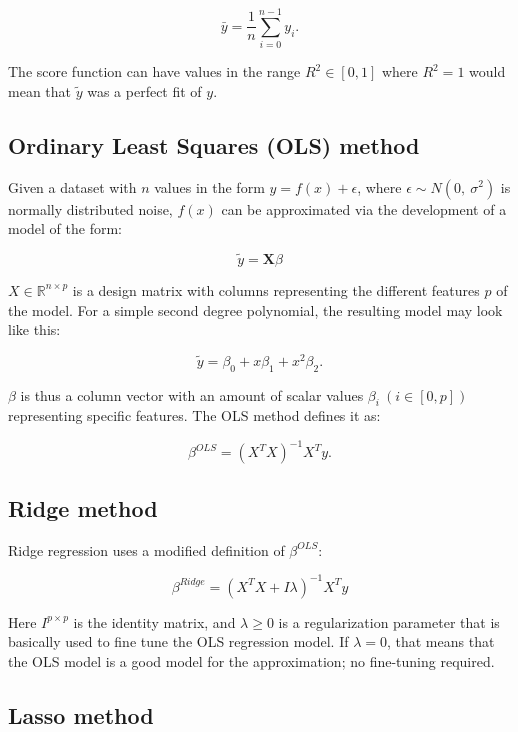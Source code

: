 \documentclass[reprint,english,notitlepage]{revtex4-1}  %
\begin{document}
\[
\bar{y} =  \frac{1}{n} \sum_{i=0}^{n - 1} y_i.
\]

The score function can have values in the range $R^2 \in [0, 1]$ where $R^2 = 1$ would mean that $\tilde{y}$ was a perfect fit of $y$.

\subsection{Ordinary Least Squares (OLS) method}

Given a dataset with $n$ values in the form $y = f(x) + \epsilon$, where $\epsilon \sim N(0, \ \sigma^2)$ is normally distributed noise, $f(x)$ can be approximated via the development of a model of the form:

\begin{equation} \label{eq:predict}
    \tilde{y} = \bm{X}\beta
\end{equation}


$X \in \mathbb{R}^{n \times p}$ is a design matrix with columns representing the different features $p$ of the model. For a simple second degree polynomial, the resulting model may look like this:

$$\tilde{y} = \beta_0 + x\beta_1 + x^2\beta_2.$$

$\beta$ is thus a column vector with an amount of scalar values $\beta_i \ (i \in [0, p])$ representing specific features. The OLS method defines it as:

$$\beta^{OLS} = (X^TX)^{-1}X^Ty.$$

\subsection{Ridge method}

Ridge regression uses a modified definition of $\beta^{OLS}$:


\begin{equation}\label{eq:ridge}
    \beta^{Ridge} = (X^TX + I\lambda)^{-1}X^Ty
\end{equation}


Here $I^{p \times p}$ is the identity matrix, and $\lambda \geq 0$ is a regularization parameter that is basically used to fine tune the OLS regression model. If $\lambda = 0$, that means that the OLS model is a good model for the approximation; no fine-tuning required. 

\subsection{Lasso method}
\end{document}
